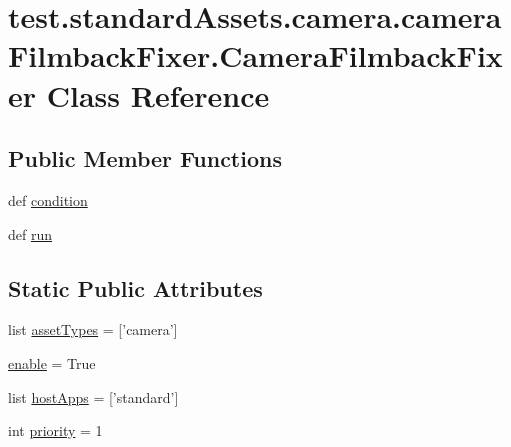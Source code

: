 \hypertarget{classtest_1_1standardAssets_1_1camera_1_1cameraFilmbackFixer_1_1CameraFilmbackFixer}{\section{test.\-standard\-Assets.\-camera.\-camera\-Filmback\-Fixer.\-Camera\-Filmback\-Fixer \-Class \-Reference}
\label{d5/d5f/classtest_1_1standardAssets_1_1camera_1_1cameraFilmbackFixer_1_1CameraFilmbackFixer}
}
\subsection*{\-Public \-Member \-Functions}
\begin{DoxyCompactItemize}
\item 
def \hyperlink{classtest_1_1standardAssets_1_1camera_1_1cameraFilmbackFixer_1_1CameraFilmbackFixer_ab936e6dcc9eab3ce42a07d817edaebcd}{condition}
\item 
def \hyperlink{classtest_1_1standardAssets_1_1camera_1_1cameraFilmbackFixer_1_1CameraFilmbackFixer_afe19a0299b075cc206befa602986517d}{run}
\end{DoxyCompactItemize}
\subsection*{\-Static \-Public \-Attributes}
\begin{DoxyCompactItemize}
\item 
list \hyperlink{classtest_1_1standardAssets_1_1camera_1_1cameraFilmbackFixer_1_1CameraFilmbackFixer_a9060fe536db3110ca8e3906895be52a0}{asset\-Types} = \mbox{[}'camera'\mbox{]}
\item 
\hyperlink{classtest_1_1standardAssets_1_1camera_1_1cameraFilmbackFixer_1_1CameraFilmbackFixer_adfc4f91e889c53e29aa8cd485f1c7b02}{enable} = \-True
\item 
list \hyperlink{classtest_1_1standardAssets_1_1camera_1_1cameraFilmbackFixer_1_1CameraFilmbackFixer_a43589a8af2480387622bc672edafbcd1}{host\-Apps} = \mbox{[}'standard'\mbox{]}
\item 
int \hyperlink{classtest_1_1standardAssets_1_1camera_1_1cameraFilmbackFixer_1_1CameraFilmbackFixer_a8f7aac670049d86422cd85e8cff8fd2e}{priority} = 1
\end{DoxyCompactItemize}


